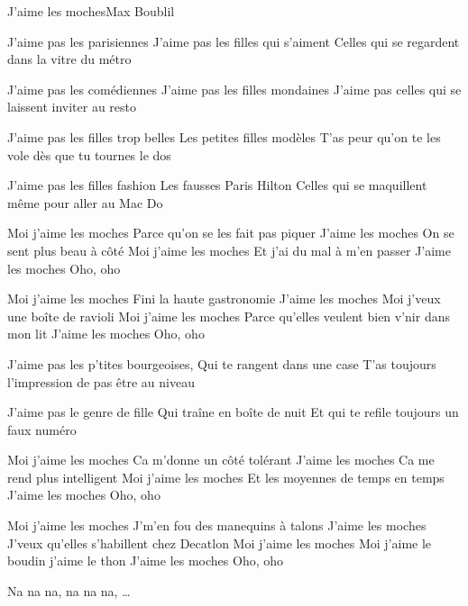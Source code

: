 \documentclass[a4paper,11pt,french]{article}
\begin{document}
\begin{Song}{J'aime les moches}{Max Boublil}

\begin{multicols}{2}
\begin{Verse}
J'aime pas les parisiennes
J'aime pas les filles qui s'aiment
Celles qui se regardent dans la vitre du métro
\espaceInterStrophe

J'aime pas les comédiennes
J'aime pas les filles mondaines
J'aime pas celles qui se laissent inviter au resto
\espaceInterStrophe

J'aime pas les filles trop belles
Les petites filles modèles
T'as peur qu'on te les vole dès que tu tournes le dos
\espaceInterStrophe

J'aime pas les filles fashion
Les fausses Paris Hilton
Celles qui se maquillent même pour aller au Mac Do
\end{Verse}
\espaceInterStrophe

\begin{Chorus}
Moi j'aime les moches
Parce qu'on se les fait pas piquer
J'aime les moches
On se sent plus beau à côté
Moi j'aime les moches
Et j'ai du mal à m'en passer
J'aime les moches
Oho, oho
\espaceInterStrophe

Moi j'aime les moches
Fini la haute gastronomie
J'aime les moches
Moi j'veux une boîte de ravioli
Moi j'aime les moches
Parce qu'elles veulent bien v'nir dans mon lit
J'aime les moches
Oho, oho
\end{Chorus}
\espaceInterStrophe

\begin{Verse}
J'aime pas les p'tites bourgeoises,
Qui te rangent dans une case
T'as toujours l'impression de pas être au niveau
\espaceInterStrophe

J'aime pas le genre de fille
Qui traîne en boîte de nuit
Et qui te refile toujours un faux numéro
\end{Verse}
\columnbreak

\begin{Chorus}
Moi j'aime les moches
Ca m'donne un côté tolérant
J'aime les moches
Ca me rend plus intelligent
Moi j'aime les moches
Et les moyennes de temps en temps
J'aime les moches
Oho, oho
\espaceInterStrophe

Moi j'aime les moches
J'm'en fou des manequins à talons
J'aime les moches
J'veux qu'elles s'habillent chez Decatlon
Moi j'aime les moches
Moi j'aime le boudin j'aime le thon
J'aime les moches
Oho, oho
\espaceInterStrophe

Na na na, na na na, \dots
\espaceInterStrophe


\end{Chorus}
\end{multicols}
\end{Song}
\end{document}
